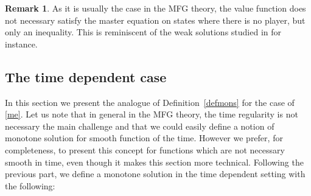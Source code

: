 \documentclass[JEP,XML,SOM,Unicode,NoEqCountersInSection,published]{cedram}
\theoremstyle{definition}
\newtheorem{Rem}{Remark}[section]
\begin{document}
\begin{Rem}
As it is usually the case in the MFG theory, the value function does not necessary satisfy the master equation on states where there is no player, but only an inequality. This is reminiscent of the weak solutions studied in \cite{cardaliaguet2015second} for instance.
\end{Rem}

\subsection{The time dependent case}
In this section we present the analogue of Definition~\ref{defmons} for the case of \eqref{me}. Let us note that in general in the MFG theory, the time regularity is not necessary the main challenge and that we could easily define a notion of monotone solution for smooth function of the time. However we prefer, for completeness, to present this concept for functions which are not necessary smooth in time, even though it makes this section more technical. Following the previous part, we define a monotone solution in the time dependent setting with the following:
\end{document}
